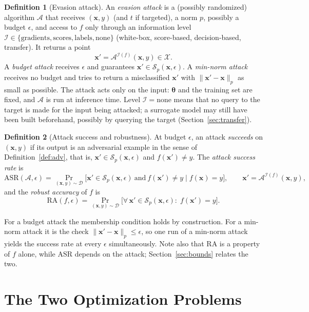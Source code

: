 \documentclass[10pt,a4paper]{extarticle}
\theoremstyle{definition}
\newtheorem{definition}{Definition}[section]
\newcommand{\X}{\mathcal{X}}
\newcommand{\D}{\mathcal{D}}
\newcommand{\x}{\mathbf{x}}
\newcommand{\xadv}{\mathbf{x}'}
\newcommand{\btheta}{\boldsymbol{\theta}}
\begin{document}
\begin{definition}[Evasion attack]\label{def:attack}
An \emph{evasion attack} is a (possibly randomized) algorithm \(\mathcal{A}\) that receives \((\x,y)\) (and \(t\) if targeted), a norm \(p\), possibly a budget \(\epsilon\), and access to \(f\) only through an information level \(\mathcal{I}\in\{\text{gradients},\text{scores},\text{labels},\text{none}\}\) (white-box, score-based, decision-based, transfer). It returns a point
\[
\xadv=\mathcal{A}^{\mathcal{I}(f)}(\x,y)\in\X .
\]
A \emph{budget attack} receives \(\epsilon\) and guarantees \(\xadv\in\mathcal{S}_p(\x,\epsilon)\). A \emph{min-norm attack} receives no budget and tries to return a misclassified \(\xadv\) with \(\|\xadv-\x\|_p\) as small as possible. The attack acts only on the input: \(\btheta\) and the training set are fixed, and \(\mathcal{A}\) is run at inference time. Level \(\mathcal{I}=\text{none}\) means that no query to the target is made for the input being attacked; a surrogate model may still have been built beforehand, possibly by querying the target (Section~\ref{sec:transfer}).
\end{definition}

\begin{definition}[Attack success and robustness]\label{def:robust}
At budget \(\epsilon\), an attack \emph{succeeds} on \((\x,y)\) if its output is an adversarial example in the sense of Definition~\ref{def:adv}, that is, \(\xadv\in\mathcal{S}_p(\x,\epsilon)\) and \(f(\xadv)\neq y\). The \emph{attack success rate} is
\[
\mathrm{ASR}(\mathcal{A},\epsilon)=\Pr_{(\x,y)\sim\D}\Big[\xadv\in\mathcal{S}_p(\x,\epsilon)\ \text{and}\ f(\xadv)\neq y \;\Big|\; f(\x)=y\Big],\qquad \xadv=\mathcal{A}^{\mathcal{I}(f)}(\x,y),
\]
and the \emph{robust accuracy} of \(f\) is
\[
\mathrm{RA}(f,\epsilon)=\Pr_{(\x,y)\sim\D}\Big[\forall\,\xadv\in\mathcal{S}_p(\x,\epsilon):\; f(\xadv)=y\Big].
\]
\end{definition}

For a budget attack the membership condition holds by construction. For a min-norm attack it is the check \(\|\xadv-\x\|_p\le\epsilon\), so one run of a min-norm attack yields the success rate at every \(\epsilon\) simultaneously. Note also that \(\mathrm{RA}\) is a property of \(f\) alone, while \(\mathrm{ASR}\) depends on the attack; Section~\ref{sec:bounds} relates the two.

\section{The Two Optimization Problems}\label{sec:problems}
\end{document}
